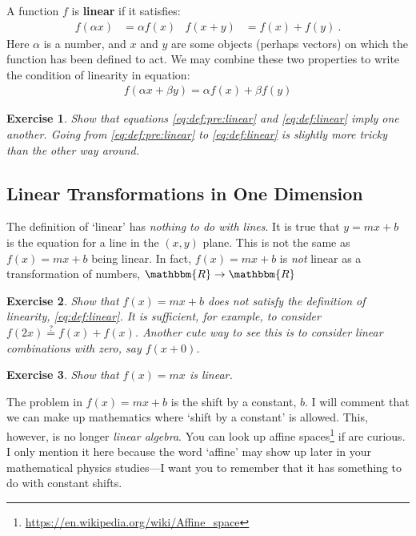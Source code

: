 \documentclass[12pt]{article}
\newtheorem{exercise}{Exercise}[section]
\begin{document}
A function $f$ is \textbf{linear} if it satisfies:
\begin{align}
  f(\alpha x) &= \alpha f(x)
  &
  f(x+y) &= f(x) + f(y) \ .
  \label{eq:def:pre:linear}
\end{align}
Here $\alpha$ is a number, and $x$ and $y$ are some objects (perhaps vectors) on which the function has been defined to act. We may combine these two properties to write the condition of linearity in equation:
\begin{align}
  f(\alpha x + \beta y) = \alpha f(x)+\beta f(y)
  \label{eq:def:linear}
\end{align}
\begin{exercise}
Show that equations \eqref{eq:def:pre:linear} and \eqref{eq:def:linear} imply one another. Going from \eqref{eq:def:pre:linear} to \eqref{eq:def:linear} is slightly more tricky than the other way around.
\end{exercise}


\subsection{Linear Transformations in One Dimension}

The definition of `linear' has \emph{nothing to do with lines}. It is true that $y=mx+b$ is the equation for a line in the $(x,y)$ plane. This is not the same as $f(x)=mx+b$ being linear. In fact, $f(x)=mx+b$ is \emph{not} linear as a transformation of numbers, $\mathbbm{R}\to\mathbbm{R}$
\begin{exercise}
Show that $f(x) = mx+b$ does \emph{not} satisfy the definition of linearity, \eqref{eq:def:linear}. It is sufficient, for example, to consider $f(2x) \stackrel{?}{=}f(x)+f(x)$. Another cute way to see this is to consider linear combinations with zero, say $f(x+0)$.
\end{exercise}

\begin{exercise}
Show that $f(x) = mx$ is linear.
\end{exercise}

The problem in $f(x)=mx+b$ is the shift by a constant, $b$. I will comment that we can make up mathematics where `shift by a constant' is allowed. This, however, is no longer \emph{linear algebra}. You can look up affine spaces\footnote{\url{https://en.wikipedia.org/wiki/Affine_space}} if are curious. I only mention it here because the word `affine' may show up later in your mathematical physics studies---I want you to remember that it has something to do with constant shifts. 
\end{document}
